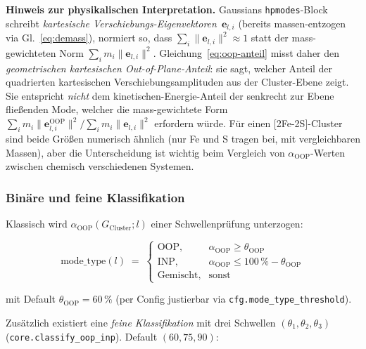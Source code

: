 \documentclass[11pt,a4paper,twoside]{article}
\newcommand{\evec}{\mathbf{e}}
\newcommand{\OOP}{\mathrm{OOP}}
\newcommand{\INP}{\mathrm{INP}}
\theoremstyle{remark}
\begin{document}
\begin{infobox}
\textbf{Hinweis zur physikalischen Interpretation.}
Gaussians \texttt{hpmodes}-Block schreibt
\emph{kartesische Verschiebungs-Eigenvektoren}~$\evec_{l,i}$ (bereits
massen-entzogen via Gl.~\ref{eq:demass}), normiert so, dass
$\sum_i \lVert\evec_{l,i}\rVert^2 \approx 1$ statt der mass-gewichteten
Norm $\sum_i m_i \lVert\evec_{l,i}\rVert^2$.
Gleichung~\ref{eq:oop-anteil} misst daher den
\emph{geometrischen kartesischen Out-of-Plane-Anteil}: sie sagt, welcher
Anteil der quadrierten kartesischen Verschiebungsamplituden aus der
Cluster-Ebene zeigt. Sie entspricht \emph{nicht} dem
kinetischen-Energie-Anteil der senkrecht zur Ebene flie\ss enden Mode,
welcher die mass-gewichtete Form
$\sum_i m_i \lVert\evec_{l,i}^{\OOP}\rVert^2 / \sum_i m_i \lVert\evec_{l,i}\rVert^2$
erfordern w\"urde. F\"ur einen [2Fe-2S]-Cluster sind beide Gr\"o\ss en
numerisch \"ahnlich (nur Fe und S tragen bei, mit vergleichbaren
Massen), aber die Unterscheidung ist wichtig beim Vergleich von
$\alpha_{\OOP}$-Werten zwischen chemisch verschiedenen Systemen.
\end{infobox}

\subsubsection*{Bin\"are und feine Klassifikation}

Klassisch wird $\alpha_{\OOP}(G_{\text{Cluster}}; l)$ einer
Schwellenpr\"ufung unterzogen:

\begin{equation}
  \text{mode\_type}(l) \;=\;
  \begin{cases}
    \OOP, & \alpha_{\OOP} \geq \theta_{\text{OOP}} \\
    \INP, & \alpha_{\OOP} \leq 100\,\% - \theta_{\text{OOP}} \\
    \text{Gemischt}, & \text{sonst}
  \end{cases}
\end{equation}

mit Default $\theta_{\text{OOP}} = 60\,\%$ (per Config justierbar via
\texttt{cfg.mode\_type\_threshold}).

Zus\"atzlich existiert eine \emph{feine Klassifikation} mit drei
Schwellen $(\theta_1, \theta_2, \theta_3)$
(\texttt{core.classify\_oop\_inp}). Default $(60, 75, 90)$:
\end{document}
